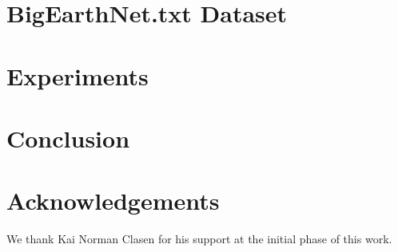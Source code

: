 \documentclass[runningheads]{llncs}
\begin{document}
\section{BigEarthNet.txt Dataset}
\label{sec:bigearth_txt}


% 

\section{Experiments}
\label{sec:experiments}


\section{Conclusion}
\label{sec:conclusion}


\section*{Acknowledgements}
We thank Kai Norman Clasen for his support at the initial phase of this work.

%
%
\FloatBarrier
\clearpage
\


\FloatBarrier
\clearpage
\setcounter{section}{0}
\setcounter{table}{0}
\setcounter{figure}{0}
\setcounter{page}{1}
\renewcommand{\thesection}{\Alph{section}}
%
\end{document}

